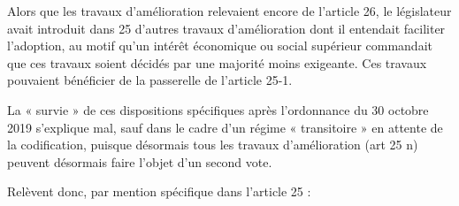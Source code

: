 				Alors que les travaux d’amélioration relevaient encore de l’article 26, le législateur avait introduit dans 25 d’autres travaux d’amélioration dont il entendait faciliter l’adoption, au motif qu’un intérêt économique ou social supérieur commandait que ces travaux soient décidés par une majorité moins exigeante. Ces travaux pouvaient bénéficier de la passerelle de l’article 25-1.
				
				La « survie » de ces dispositions spécifiques après l’ordonnance du 30 octobre 2019 s’explique mal, sauf dans le cadre d’un régime « transitoire » en attente de la codification, puisque désormais tous les travaux d’amélioration (art 25 n) peuvent désormais faire l’objet d’un second vote.
				
				Relèvent donc, par mention spécifique dans l’article 25 :
				
